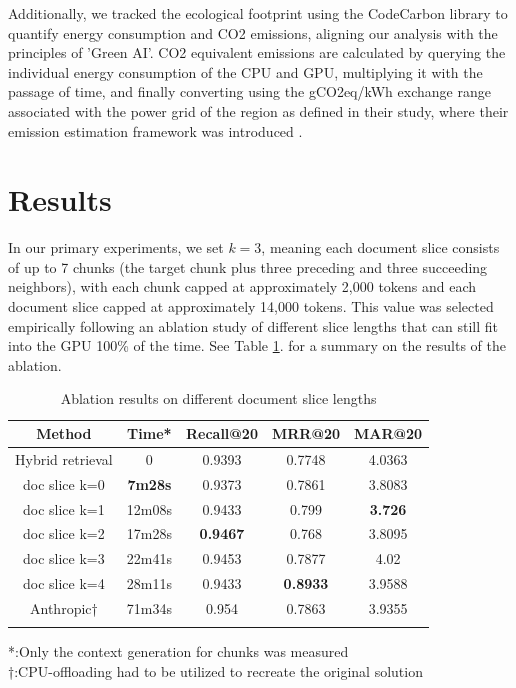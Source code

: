 \documentclass[conference]{IEEEtran}
\begin{document}
Additionally, we tracked the ecological footprint using the CodeCarbon library \cite{codecarbon_software} to quantify energy consumption and CO2 emissions, aligning our analysis with the principles of 'Green AI'. CO2 equivalent emissions are calculated by querying the individual energy consumption of the CPU and GPU, multiplying it with the passage of time, and finally converting using the gCO2eq/kWh exchange range associated with the power grid of the region as defined in their study, where their emission estimation framework was introduced \cite{lacoste2019quantifyingcarbonemissionsmachine}.


\section{Results}
\label{sec:results}

In our primary experiments, we set $k = 3$, meaning each document slice consists of up to 7 chunks (the target chunk plus three preceding and three succeeding neighbors), with each chunk capped at approximately 2,000 tokens and each document slice capped at approximately 14,000 tokens. This value was selected empirically following an ablation study of different slice lengths that can still fit into the GPU 100\% of the time. See Table \ref{tab:ablation_summary}. for a summary on the results of the ablation. 

\begin{table}[ht!]
    \centering
    \caption{Ablation results on different document slice lengths}
    \label{tab:ablation_summary}
    \begin{tabular}{ccccc}
        \toprule
        \textbf{Method} & \textbf{Time*} & \textbf{Recall@20} & \textbf{MRR@20} & \textbf{MAR@20} \\
        \midrule
        Hybrid retrieval & 0 & 0.9393 & 0.7748 & 4.0363 \\
        doc slice k=0 & \textbf{7m28s} & 0.9373 & 0.7861 & 3.8083  \\
        doc slice k=1 & 12m08s & 0.9433 & 0.799 & \textbf{3.726} \\
        doc slice k=2 & 17m28s & \textbf{0.9467} & 0.768 & 3.8095 \\
        doc slice k=3 & 22m41s & 0.9453 & 0.7877 & 4.02 \\
        doc slice k=4 & 28m11s & 0.9433 & \textbf{0.8933} & 3.9588 \\
        Anthropic† & 71m34s & 0.954 & 0.7863 & 3.9355 \\
        \bottomrule
        \\
    \end{tabular}
    *:Only the context generation for chunks was measured \\
    †:CPU-offloading had to be utilized to recreate the original solution
\end{table}
\end{document}
